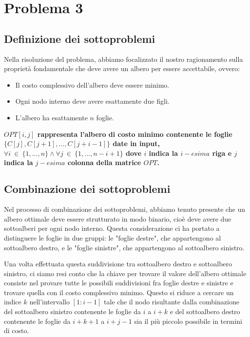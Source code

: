\section{Problema 3}

\subsection{Definizione dei sottoproblemi}

Nella risoluzione del problema, abbiamo focalizzato il nostro ragionamento sulla proprietà fondamentale che deve avere un albero per
essere accettabile, ovvero:
\begin{itemize}
    \item Il costo complessivo dell'albero deve essere minimo.
    \item Ogni nodo interno deve avere esattamente due figli.
    \item L'albero ha  esattamente $n$ foglie.
\end{itemize}

\begin{center}
    \textbf{$OPT[i, j]$ rappresenta l'albero di costo minimo contenente le foglie $\{C[j], C[j + 1], ..., C[j + i - 1]\}$ date in input, 
    $\forall i\ \in\ \{1, ..., n\} \land \forall j\ \in\ \{1, ..., n - i + 1\}$ dove $i$ indica la $i-esima$ riga e $j$ indica la $j-esima$ colonna della matrice $OPT$.}
\end{center}

\subsection{Combinazione dei sottoproblemi}

Nel processo di combinazione dei sottoproblemi, abbiamo tenuto presente che un albero ottimale deve essere strutturato in modo binario, cioè deve avere due 
sottoalberi per ogni nodo interno. Questa considerazione ci ha portato a distinguere le foglie in due gruppi: le "foglie destre", che appartengono al sottoalbero 
destro, e le "foglie sinistre", che appartengono al sottoalbero sinistro.

Una volta effettuata questa suddivisione tra sottoalbero destro e sottoalbero sinistro, ci siamo resi conto che la chiave per trovare il valore dell'albero 
ottimale consiste nel provare tutte le possibili suddivisioni fra foglie destre e sinistre e trovare quella con il costo complessivo minimo. Questo si riduce a 
cercare un indice $k$ nell'intervallo $[1 : i - 1]$ tale che il nodo risultante dalla combinazione del sottoalbero sinistro contenente le foglie da $i$ a $i+k$ e del 
sottoalbero destro contenente le foglie da $i+k+1$ a $i+j-1$ sia il più piccolo possibile in termini di costo.

